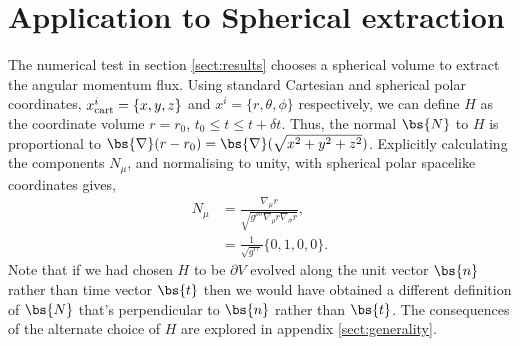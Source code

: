 \section{Application to Spherical extraction} \label{sect:sphere}
The numerical test in section \ref{sect:results} chooses a spherical volume to extract the angular momentum flux. Using standard Cartesian and spherical polar coordinates, $x^i_{\rm{cart}} = \{x,y,z\}$ and $x^i=\{r,\theta,\phi\}$ respectively, we can define $H$ as the coordinate volume $r=r_0$, $t_0\leq t \leq t+\delta t$. Thus, the normal $\bs{N}$ to $H$ is proportional to $\bs{\nabla}(r-r_0) = \bs{\nabla}(\sqrt{x^2 + y^2 + z^2})$. Explicitly calculating the components $N_\mu$, and normalising to unity, with spherical polar spacelike coordinates gives,
\begin{align}
N_\mu &= \frac{\nabla_\mu r}{\sqrt{g^{\rho\sigma} \nabla_\rho r \nabla_\sigma r}}, \\
     \label{radial_N} &= \frac{1}{\sqrt{g^{rr}}}\{0,1,0,0\}.
\end{align}
Note that if we had chosen $H$ to be $\partial V$ evolved along the unit vector $\bs{n}$ rather than time vector $\bs{t}$ then we would have obtained a different definition of $\bs{N}$ that's perpendicular to $\bs{n}$ rather than $\bs{t}$. The consequences of the alternate choice of $H$ are explored in appendix \ref{sect:generality}.



